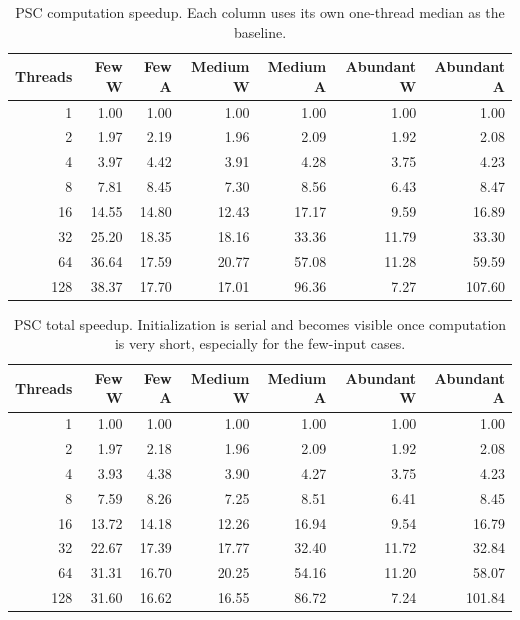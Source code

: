 \documentclass[11pt]{article}
\begin{document}
{\begin{table}[!htbp]
\centering
\scriptsize
\setlength{\tabcolsep}{3pt}
\begin{tabular}{@{}r r r r r r r@{}}
\toprule
Threads & Few W & Few A & Medium W & Medium A & Abundant W & Abundant A \\
\midrule
1   & 1.00 & 1.00 & 1.00 & 1.00 & 1.00 & 1.00 \\
2   & 1.97 & 2.19 & 1.96 & 2.09 & 1.92 & 2.08 \\
4   & 3.97 & 4.42 & 3.91 & 4.28 & 3.75 & 4.23 \\
8   & 7.81 & 8.45 & 7.30 & 8.56 & 6.43 & 8.47 \\
16  & 14.55 & 14.80 & 12.43 & 17.17 & 9.59 & 16.89 \\
32  & 25.20 & 18.35 & 18.16 & 33.36 & 11.79 & 33.30 \\
64  & 36.64 & 17.59 & 20.77 & 57.08 & 11.28 & 59.59 \\
128 & 38.37 & 17.70 & 17.01 & 96.36 & 7.27 & 107.60 \\
\bottomrule
\end{tabular}
\caption{PSC computation speedup. Each column uses its own one-thread median
as the baseline.}
\label{tab:psc-compute-speedup}
\end{table}

\begin{table}[!htbp]
\centering
\scriptsize
\setlength{\tabcolsep}{3pt}
\begin{tabular}{@{}r r r r r r r@{}}
\toprule
Threads & Few W & Few A & Medium W & Medium A & Abundant W & Abundant A \\
\midrule
1   & 1.00 & 1.00 & 1.00 & 1.00 & 1.00 & 1.00 \\
2   & 1.97 & 2.18 & 1.96 & 2.09 & 1.92 & 2.08 \\
4   & 3.93 & 4.38 & 3.90 & 4.27 & 3.75 & 4.23 \\
8   & 7.59 & 8.26 & 7.25 & 8.51 & 6.41 & 8.45 \\
16  & 13.72 & 14.18 & 12.26 & 16.94 & 9.54 & 16.79 \\
32  & 22.67 & 17.39 & 17.77 & 32.40 & 11.72 & 32.84 \\
64  & 31.31 & 16.70 & 20.25 & 54.16 & 11.20 & 58.07 \\
128 & 31.60 & 16.62 & 16.55 & 86.72 & 7.24 & 101.84 \\
\bottomrule
\end{tabular}
\caption{PSC total speedup. Initialization is serial and becomes visible once
computation is very short, especially for the few-input cases.}
\label{tab:psc-total-speedup}
\end{table}

}
\end{document}
